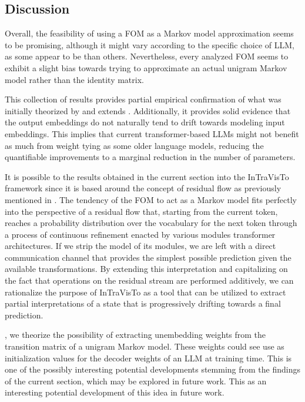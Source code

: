 
\subsection{Discussion}

Overall, the feasibility of using a FOM as a Markov model approximation seems to be promising, although it might vary according to the specific choice of LLM, as some appear to be  than others.
Nevertheless, every analyzed FOM seems to exhibit a slight bias towards trying to approximate an actual unigram Markov model rather than the identity matrix.

This collection of results provides partial empirical confirmation of what was initially theorized by  and extends .
Additionally, it provides solid evidence that the output embeddings do not naturally tend to drift towards modeling input embeddings.
This implies that current transformer-based LLMs might not benefit as much from weight tying as some older language models, reducing the quantifiable improvements to a marginal reduction in the number of parameters.

It is possible to  the results obtained in the current section into the InTraVisTo framework since it is based around the concept of residual flow as previously mentioned in .
The tendency of the FOM to act as a Markov model fits perfectly into the perspective of a residual flow that, starting from the current token, reaches a probability distribution over the vocabulary for the next token through a process of continuous refinement enacted by various modules  transformer architectures.
If we strip the model of its modules, we are left with a direct communication channel that provides the simplest possible prediction given the available transformations.
By extending this interpretation and capitalizing on the fact that operations on the residual stream are performed additively, we can rationalize the purpose of InTraVisTo as a tool that can be utilized to extract partial interpretations of a state that is progressively drifting towards a final prediction.

, we theorize the possibility of extracting unembedding weights from the transition matrix of a unigram Markov model.
These weights could see use as initialization values for the decoder weights of an LLM at training time.
This is one of the possibly interesting potential developments stemming from the findings of the current section, which may be explored in future work.
This as an interesting potential development of this idea in future work.